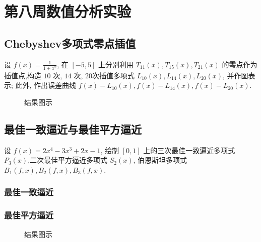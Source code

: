 \section{第八周数值分析实验}
\subsection{Chebyshev多项式零点插值}
\begin{ex}
	设 $f(x)=\frac{1}{1+x^2}$, 在 $[-5,5]$ 上分别利用 $T_{11}(x), T_{15}(x), T_{21}(x)$ 的零点作为插值点,构造 $10$ 次, $14$ 次, $20 $次插值多项式 $L_{10}(x), L_{14}(x), L_{20}(x)$, 并作图表示; 此外, 作出误差曲线 $f(x)-L_{10}(x), f(x)-L_{14}(x), f(x)-L_{20}(x)$.
\end{ex}

\begin{figure}[H]
	\centering
	\hfill
	\caption{结果图示}
\end{figure}
\subsection{最佳一致逼近与最佳平方逼近}
\begin{ex}
	设 $f(x)=2 x^4-3 x^3+2 x-1$, 绘制 $[0,1]$ 上的三次最佳一致逼近多项式 $P_3(x)$,二次最佳平方逼近多项式 $S_2(x)$, 伯恩斯坦多项式 $B_1(f, x), B_2(f, x), B_3(f, x)$.
\end{ex}
\subsubsection{最佳一致逼近}

\subsubsection{最佳平方逼近}


\begin{figure}[H]
	\centering
	\hfill
	\caption{结果图示}
\end{figure}